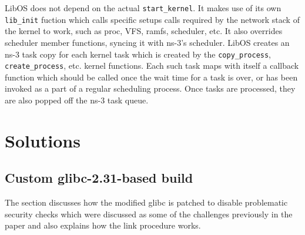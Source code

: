 \documentclass{sig-alternate}
\begin{document}
LibOS does not depend on the actual \texttt{start\_kernel}. It makes 
use of its own \texttt{lib\_init} fuction which calls specific setups calls required by the network stack of the kernel to 
work, such as proc, VFS, ramfs, scheduler, etc. It also overrides scheduler member functions, syncing it with ns-3's 
scheduler. LibOS creates an ns-3 task copy for each kernel task which is created by the \texttt{copy\_process}, \texttt{create\_process},
etc. kernel functions. Each such task maps with itself a callback function which should be called once the wait time
for a task is over, or has been invoked as a part of a regular scheduling process. Once tasks are processed, they are 
also popped off the ns-3 task queue.

\section{Solutions}
\label{section:design}

\subsection{Custom glibc-2.31-based build}
The section discusses how the modified glibc is patched to disable problematic security checks which were discussed as some of the challenges previously
in the paper and also explains how the link procedure works.
\end{document}

